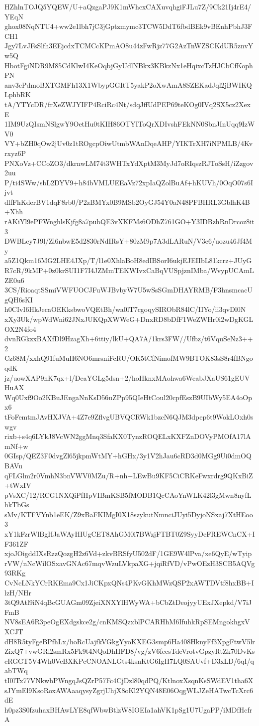 HZhlnTOJQ5YQEW/U+aQzgaPJ9K1mWhcxCAXuvqhgiFJLu7Z/9Ck21Ij4rE4/YEqN
ghox08NqNTU4+ww2e1lbh7jC3jGptzmymc3TCW5DdT6fbdBEk9vBEnhPbhJ3FCH1
Jgy7LvJFsSlfh3EEjcdxTCMCcKPmAO8u44zFwRjz77G2AzTnWZSCKdUR5znvYw5Q
HbotFgiNDR9M85CdKlwI4KeOqbjGyUdlNBkx3KBkzNx1eHqixcTzHJCbCfKophPN
anv3cPdmoBXTGMFh13X1WbypGGItT5yakP2oXwAmA8SZEKadJql2jBWIKQLphbRK
tA/YTYcDR/frXeZWJYIFP4RciRc4Nt/sdqJffUdPEP69teKOg0IVq2SX5cz2XexE
1IM9UzQIsmNSlgwY9OetHu0tKIH86OTYIToQrXDIvshFEkNN0SbnJInUqq9IzWV0
VY+bZH0qOw2jUv0z1tROgcpOiwUtmbWAnDqeAHP/YIKTrXH7iNPMLB/4Kvrxyz6P
PNXoVz+CCoZO3/dkrnwLM74t3WHTxYdXptM3MyJd7oRIqszRJToSsH/iZzgov2uu
P/ti4SWw/sbL2DYV9+h84bVMLUEEaVz72xpIaQZolBuAf+hKUVh/0OqO07s6Ijvt
dlfFhKderBV1dqF8rb0/P2zBMYx0B9MSb2OyGJ54Y0aN48PFBHRL3GblhK4B+Xhh
rAKiYl9ePFWnghlsKjfg8a7pubQE3vXKFMs6ODhZ761GO+Y3IDBzhRnDrcoz8it3
DWBLcy7J9l/Zl6nbwE5d2830rNdIRsY+80zM9p7A3dLARuN/V3e6/uozu46Jf4My
a5Z1Qkm16MG2LHE4JXp/T/l1e0XhlaBoH8edIBSorI6ukjEJEIIbL81kcrz+JUyG
R7cR/9kMP+0z0krSUI1F7I4JZMmTEKWIvxCaBqVUSpjznIMba/WvypUCAmLZE0u6
3CS/RioaqtSSmiVWFUOCJFuWJBvbyW7U5wSsSGmDHAYRMB/F3hnsmcacUgQH6sKI
h0CIvI6HkJecaOEKksbwoVQEtBh/wa0lT7cgoqySIRObR84lC/IIYo/ii3qvDl0N
xXy3Uk/wpWdWni62JNxJUKQpXWWeG+DnxRD8bDfF1WeZWHr0i2wDgKGLOX2N4fo4
dvnRGkzxBAXfDl9HzagXh+6ttiy/lkU+QA7A/1krs3FW//Ufbz/t6VquSeNz3++2
Cz68M/xxhQ91fuMuH6NO6mrsniFcRU/OK5tCfNimofMW9BTOK83sS8r4fBNgoqdK
jz/uowXAP9nK7qx+l/DeaYGLg5dsn+2/hoHknxMAohwa6WeabJXaUS61gEUVHuAX
Wq0Uxf9Oo2KBuJEngaNnKsD56uZPp95QIeHtCoul20cpfEszB9UIbWy5EA4oOpx6
tFoFemtmJAvHXJVA+4Z7e9ZflvgUBVQCRWk1bzcN6QJM3dpep6t9WokLOxh0swgv
rixb+s4q6LYkJ8VcWN2ggMnq3SfaKX0TynzROQELxKXFZnDOVyPMOfA17lAmNf+w
0GIsp/QEZ3F0dvgZl65jkpmWtMY+hGHx/3y1V2hJau6cRD3d0MGg9Ui0dmOQBAVu
qFLGlm2r0VmhN3bnVWV0MZu/R+nh+LEwBu9KF5CiCRKeFwxrdrg9QKxBiZ+tWxIV
pVsXC/12/RCG1NXQiPfHpVIBmKSB5fMODB1QcCAoYnWLK42l3gMwn8nyfLhkTbGs
sMv/KTFVYnb1eEK/Z9xBaFKIMgI0X18szykutNmnciJUyi5DyjoNSxaj7XtHEoo3
xY1kFzrWlBgHJaWAyHIUgCET8AhGM0i7BWzjFTBT0Z9SyyDeFREWCnCX+IF361ZF
xjoJOigddIXsRzzQozgH2z6Vd+zkvBRSfyU502dF/1GE9W4lPva/xe6QyE/wTyip
rVW/nNcWilOSxavGNAc67mqvWzuLVkpaXG+jqiRfVD/vPwOEzH3SCB5AQVg93RKg
CvNcLNkYCrRKEma9Cx1JiCKpxQNs4PKvGKhMWzQSP2xAWTDVtf8hxBB+IlzH/NHr
3tQ9Atl9iN4qBcGUAGm09ZjeiXNXYlHWyWA+bCbZtDeojyyUExJXepkd/V7iJFmB
NV8sEA6R3peOgEXdgskce2g/cnKMSQzxblPCARHhM6IfuhkRpSEMngokhgxVXCJT
dH8R5tyFgeBPfhLx/hoRcUajfkVGkgYyoKXEG3smp6Ha408HknyFf3XpgFtwV5lr
ZixQ7+vwGRl2smRx5Fk9t4NQoDhHFD8/vg/zV6fecsTdeVrotvGpzyRtZk70DvKs
cRGGT5V4Wh0VeBXKPcCNOANLGts4ksnKtG6IgH7LQ0SAUvf+D3xLD/6qI/qabTWq
tI0lTx77VNkwbPWngqJsQZrP57Fc4CjDzl80qdPQ/KtlnoxXsqnKsSWdEV1tha6X
sJYmEl9KsoRoxAWAaaqysyZgrjUhjX8oKl2YQN48E06OqgWLJZeHATwcTcXrc6dE
h0pz3S0fzuhaxBHAwLYE8qfWbwBtlzW8IOEIa1ahVK1pSg1U7UgaPP/iMDfHcfrA
